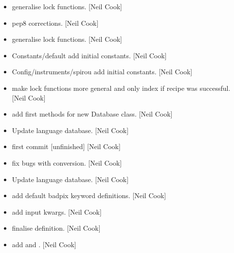 \documentclass[a4paper,10pt,english]{report}
\begin{document}
\begin{itemize}
\item {} 
 \sphinxhyphen{} generalise lock functions. {[}Neil Cook{]}

\item {} 
 \sphinxhyphen{} pep8 corrections. {[}Neil Cook{]}

\item {} 
 \sphinxhyphen{} generalise lock functions. {[}Neil Cook{]}

\item {} 
Constants/default \sphinxhyphen{} add initial  constants. {[}Neil Cook{]}

\item {} 
Config/instruments/spirou \sphinxhyphen{} add initial  constants. {[}Neil Cook{]}

\item {} 
 \sphinxhyphen{} make lock functions more general and only index if
recipe was successful. {[}Neil Cook{]}

\item {} 
 \sphinxhyphen{} add first methods for new Database class. {[}Neil
Cook{]}

\item {} 
Update language database. {[}Neil Cook{]}

\item {} 
 \sphinxhyphen{} first commit {[}unfinished{]} {[}Neil Cook{]}

\item {} 
 \sphinxhyphen{} fix bugs with conversion. {[}Neil Cook{]}

\item {} 
Update language database. {[}Neil Cook{]}

\item {} 
 \sphinxhyphen{} add default badpix keyword definitions. {[}Neil Cook{]}

\item {} 
 \sphinxhyphen{} add input kwargs. {[}Neil Cook{]}

\item {} 
 \sphinxhyphen{} finalise  definition. {[}Neil Cook{]}

\item {} 
 \sphinxhyphen{} add  and . {[}Neil Cook{]}


\end{itemize}
\end{document}
